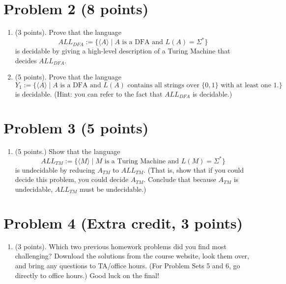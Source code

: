 \documentclass[letterpaper,11pt,twoside]{article}
\theoremstyle{plain}
\theoremstyle{definition}
\theoremstyle{remark}
\theoremstyle{restate}
\begin{document}
\clearpage
\section{Problem 2 (8 points)}
\begin{enumerate}
    \item (3 points). Prove that the language
    \[
        ALL_{DFA} := \{ \langle A \rangle \; | \; A \text{ is a DFA and } L(A) = \Sigma^*\}
    \]
    is decidable by giving a high-level description of a Turing Machine that decides $ALL_{DFA}$.
    
    \item (5 points). Prove that the language
    \[
        Y_1 := \{ \langle A \rangle \; | \; A \text{ is a DFA and } L(A) \text{ contains all strings over } \{0,1\} \text{ with at least one 1.} \}
    \]
    is decidable. (Hint: you can refer to the fact that $ALL_{DFA}$ is decidable.)
    
\end{enumerate}

\clearpage
\section{Problem 3 (5 points)}
    \begin{enumerate}
    \item (5 points.) Show that the language 
    \[
        ALL_{TM} := \{ \langle M \rangle \; | \; M \text{ is a Turing Machine and } L(M) = \Sigma^*\}
    \]
    is undecidable by reducing $A_{TM}$ to $ALL_{TM}$. (That is, show that if you could decide this problem, you could decide $A_{TM}$. Conclude that because $A_{TM}$ is undecidable, $ALL_{TM}$ must be undecidable.)
    
    \end{enumerate}
    
    
\clearpage
\section{Problem 4 (Extra credit, 3 points)}
\begin{enumerate}
    \item (3 points). Which two previous homework problems did you find most challenging? Download the solutions from the course website, look them over, and bring any questions to TA/office hours. (For Problem Sets 5 and 6, go directly to office hours.) Good luck on the final!
    
\end{enumerate}
\end{document}
